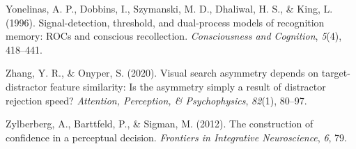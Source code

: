 \documentclass[12pt,twoside]{reedthesis}
\begin{document}
\leavevmode\hypertarget{ref-yonelinas1996signal}{}%
Yonelinas, A. P., Dobbins, I., Szymanski, M. D., Dhaliwal, H. S., \& King, L. (1996). Signal-detection, threshold, and dual-process models of recognition memory: ROCs and conscious recollection. \emph{Consciousness and Cognition}, \emph{5}(4), 418--441.

\leavevmode\hypertarget{ref-zhang2020visual}{}%
Zhang, Y. R., \& Onyper, S. (2020). Visual search asymmetry depends on target-distractor feature similarity: Is the asymmetry simply a result of distractor rejection speed? \emph{Attention, Perception, \& Psychophysics}, \emph{82}(1), 80--97.

\leavevmode\hypertarget{ref-zylberberg2012construction}{}%
Zylberberg, A., Barttfeld, P., \& Sigman, M. (2012). The construction of confidence in a perceptual decision. \emph{Frontiers in Integrative Neuroscience}, \emph{6}, 79.


\end{document}
